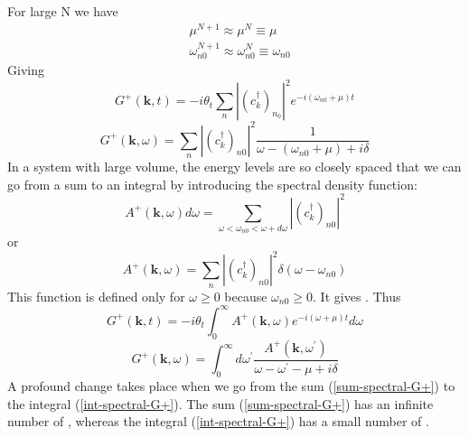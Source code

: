 For large N we have
\begin{equation}\begin{aligned}
&\mu^{N+1} \approx \mu^{N} \equiv \mu\\
&\omega_{n 0}^{N+1} \approx \omega_{n 0}^{N} \equiv \omega_{n 0}
\end{aligned}\end{equation}
Giving
\begin{equation}G^{+}(\mathbf{k}, t)=-i \theta_{t} \sum_{n}\left|\left(c_{k}^{\dagger}\right)_{n_{0}}\right|^{2} e^{-i\left(\omega_{n 0}+\mu\right) t}
\label{sum-spectral-G+-time}
\end{equation}
\begin{equation}
    G^{+}(\mathbf{k}, \omega)=\sum_{n}\left|\left(c_{k}^{\dagger}\right)_{n 0}\right|^{2} \frac{1}{\omega-\left(\omega_{n 0}+\mu\right)+i \delta}
\label{sum-spectral-G+}
\end{equation}
In a system with large volume, the energy levels are so closely spaced that we can go from a sum to an integral by introducing the spectral density function:
\begin{equation}A^{+}(\mathbf{k}, \omega) d \omega=\sum_{\omega<\omega_{n0}<\omega+d \omega}\left|\left(c_{k}^{\dagger}\right)_{n 0}\right|^{2}\end{equation}
or
\begin{equation}A^{+}(\mathbf{k}, \omega)=\sum_{n}\left|\left(c_{k}^{\dagger}\right)_{n 0}\right|^{2} \delta\left(\omega-\omega_{n 0}\right)\end{equation}
This function is defined only for $\omega\geq0$ because $\omega_{n0}\geq0$. It gives \textbf{}. Thus
\begin{equation}
    G^{+}(\mathbf{k}, t)=-i \theta_{t} \int_{0}^{\infty} A^{+}(\mathbf{k}, \omega) e^{-i(\omega+\mu) t} d \omega
\label{int-spectral-G+-t}
\end{equation}
\begin{equation}
G^{+}(\mathbf{k}, \omega)=\int_{0}^{\infty} d \omega^{\prime} \frac{A^{+}(\mathbf{k}, \omega^{\prime})}{\omega-\omega^{\prime}-\mu+i \delta}
\label{int-spectral-G+}
\end{equation}
A profound change takes place when we go from the sum (\ref{sum-spectral-G+}) to the integral (\ref{int-spectral-G+}). The sum (\ref{sum-spectral-G+}) has an infinite number of \textbf{}, whereas the integral (\ref{int-spectral-G+}) has a small number of \textbf{}.

